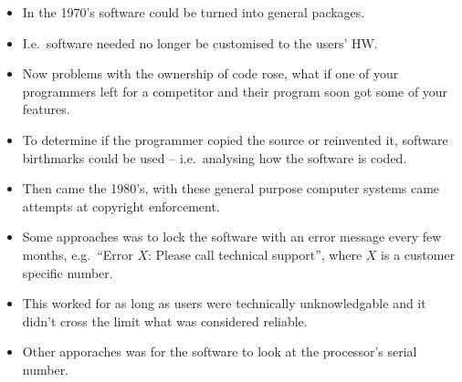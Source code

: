 \documentclass{beamer}
\begin{document}
\begin{frame}
  \begin{itemize}
    \item In the 1970's software could be turned into general packages.

    \item I.e.\ software needed no longer be customised to the users' HW\@.

    \item Now problems with the ownership of code rose, what if one of your 
      programmers left for a competitor and their program soon got some of your 
      features.

    \item To determine if the programmer copied the source or reinvented it, 
      software birthmarks could be used -- i.e.\ analysing how the software is 
      coded.
  \end{itemize}
\end{frame}

\begin{frame}
  \begin{itemize}
    \item Then came the 1980's, with these general purpose computer systems 
      came attempts at copyright enforcement.

    \item Some approaches was to lock the software with an error message every 
      few months, e.g.\ ``Error \(X\):  Please call technical support'', where 
      \(X\) is a customer specific number.

    \item This worked for as long as users were technically unknowledgable and 
      it didn't cross the limit what was considered reliable.

    \item Other apporaches was for the software to look at the processor's 
      serial number.
  \end{itemize}
\end{frame}
\end{document}
